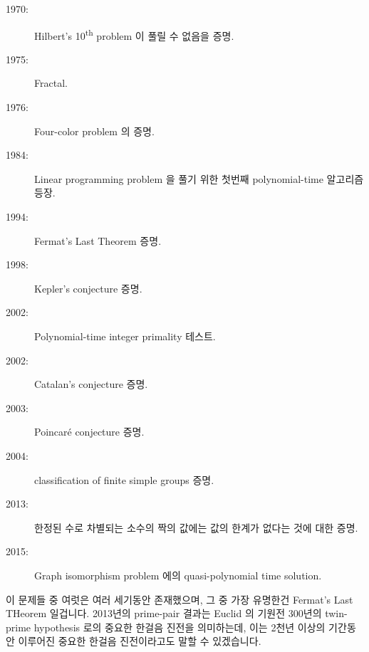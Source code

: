 \begin{description}
\item[1970:] Hilbert's 10\textsuperscript{th} problem 이 풀릴 수 없음을 증명.
\item[1975:] Fractal.
\item[1976:] Four-color problem 의 증명.
\item[1984:] Linear programming problem 을 풀기 위한 첫번째 polynomial-time
	     알고리즘 등장.
\item[1994:] Fermat's Last Theorem 증명.
\item[1998:] Kepler's conjecture 증명.
\item[2002:] Polynomial-time integer primality 테스트.
\item[2002:] Catalan's conjecture 증명.
\item[2003:] Poincar\'e conjecture 증명.
\item[2004:] classification of finite simple groups 증명.
\item[2013:] 한정된 수로 차별되는 소수의 짝의 값에는 값의 한계가 없다는 것에
	     대한 증명.
\item[2015:] Graph isomorphism problem 에의 quasi-polynomial time solution.

\end{description}

이 문제들 중 여럿은 여러 세기동안 존재했으며, 그 중 가장 유명한건 Fermat's Last
THeorem 일겁니다.
2013년의 prime-pair 결과는 Euclid 의 기원전 300년의 twin-prime hypothesis 로의
중요한 한걸음 진전을 의미하는데, 이는 2천년 이상의 기간동안 이루어진 중요한
한걸음 진전이라고도 말할 수 있겠습니다.

